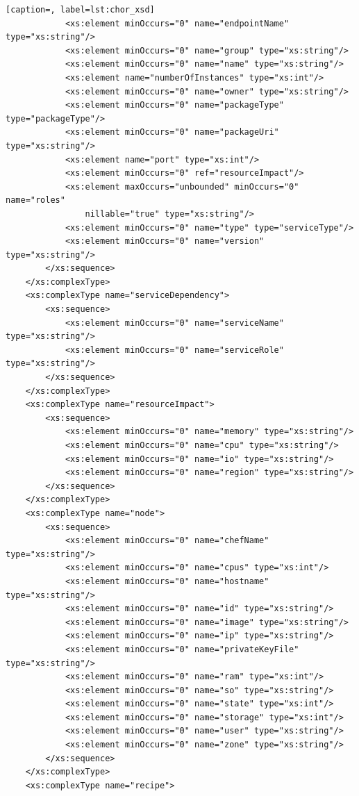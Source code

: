\documentclass[a4paper, 10pt]{article}
\begin{document}
{\begin{lstlisting}[caption=, label=lst:chor_xsd]
            <xs:element minOccurs="0" name="endpointName" type="xs:string"/>
            <xs:element minOccurs="0" name="group" type="xs:string"/>
            <xs:element minOccurs="0" name="name" type="xs:string"/>
            <xs:element name="numberOfInstances" type="xs:int"/>
            <xs:element minOccurs="0" name="owner" type="xs:string"/>
            <xs:element minOccurs="0" name="packageType" type="packageType"/>
            <xs:element minOccurs="0" name="packageUri" type="xs:string"/>
            <xs:element name="port" type="xs:int"/>
            <xs:element minOccurs="0" ref="resourceImpact"/>
            <xs:element maxOccurs="unbounded" minOccurs="0" name="roles"
                nillable="true" type="xs:string"/>
            <xs:element minOccurs="0" name="type" type="serviceType"/>
            <xs:element minOccurs="0" name="version" type="xs:string"/>
        </xs:sequence>
    </xs:complexType>
    <xs:complexType name="serviceDependency">
        <xs:sequence>
            <xs:element minOccurs="0" name="serviceName" type="xs:string"/>
            <xs:element minOccurs="0" name="serviceRole" type="xs:string"/>
        </xs:sequence>
    </xs:complexType>
    <xs:complexType name="resourceImpact">
        <xs:sequence>
            <xs:element minOccurs="0" name="memory" type="xs:string"/>
            <xs:element minOccurs="0" name="cpu" type="xs:string"/>
            <xs:element minOccurs="0" name="io" type="xs:string"/>
            <xs:element minOccurs="0" name="region" type="xs:string"/>
        </xs:sequence>
    </xs:complexType>
    <xs:complexType name="node">
        <xs:sequence>
            <xs:element minOccurs="0" name="chefName" type="xs:string"/>
            <xs:element minOccurs="0" name="cpus" type="xs:int"/>
            <xs:element minOccurs="0" name="hostname" type="xs:string"/>
            <xs:element minOccurs="0" name="id" type="xs:string"/>
            <xs:element minOccurs="0" name="image" type="xs:string"/>
            <xs:element minOccurs="0" name="ip" type="xs:string"/>
            <xs:element minOccurs="0" name="privateKeyFile" type="xs:string"/>
            <xs:element minOccurs="0" name="ram" type="xs:int"/>
            <xs:element minOccurs="0" name="so" type="xs:string"/>
            <xs:element minOccurs="0" name="state" type="xs:int"/>
            <xs:element minOccurs="0" name="storage" type="xs:int"/>
            <xs:element minOccurs="0" name="user" type="xs:string"/>
            <xs:element minOccurs="0" name="zone" type="xs:string"/>
        </xs:sequence>
    </xs:complexType>
    <xs:complexType name="recipe">

\end{lstlisting}}
\end{document}
